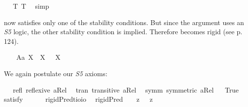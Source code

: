 \begin{isabellebody}
\ %
%
\isamarkupfalse%
\ T{}\ T{}\ \isamarkupfalse%
\ simp\ \ %
%
%
%
%
\isamarkuptrue%
%
\begin{isamarkuptext}%
\isa{{\isasymP}} now satisfies only one of the stability conditions. But since the argument uses an \emph{S5} logic, 
the other stability condition is implied. Therefore \isa{{\isasymP}} becomes rigid (see p. 124).%
\end{isamarkuptext}\isamarkuptrue%
\isamarkupfalse%
\ \isanewline
\ \ A{}a{\isacharcolon}\ {\isachardoublequoteopen}{\isasymlfloor}\isactrlbold {\isasymforall}X{\isachardot}\ {\isasymP}\ X\ \isactrlbold {\isasymrightarrow}\ \isactrlbold {\isasymbox}{\isacharparenleft}{\isasymP}\ X{\isacharparenright}{\isasymrfloor}{\isachardoublequoteclose}\ \ \ \ \ \ %
%
\begin{isamarkuptext}%
We again postulate our \emph{S5} axioms:%
\end{isamarkuptext}\isamarkuptrue%
\isamarkupfalse%
\ \isanewline
\ refl{\isacharcolon}\ {\isachardoublequoteopen}reflexive\ aRel{\isachardoublequoteclose}\ \isanewline
\ tran{\isacharcolon}\ {\isachardoublequoteopen}transitive\ aRel{\isachardoublequoteclose}\ \isanewline
\ symm{\isacharcolon}\ {\isachardoublequoteopen}symmetric\ aRel{\isachardoublequoteclose}\isanewline
\ \isanewline
{}\isamarkupfalse%
\ True\ \isamarkupfalse%
{\isacharbrackleft}satisfy{\isacharbrackright}%
\ %
%
\isamarkupfalse%
\ %
%
%
%
\isanewline
\ \isanewline
{}\isamarkupfalse%
\ rigidPred{\isacharcolon}{\isacharcolon}{\isachardoublequoteopen}{\isacharparenleft}{\isacharprime}t{\isasymRightarrow}io{\isacharparenright}{\isasymRightarrow}io{\isachardoublequoteclose}\ \isanewline
\ {\isachardoublequoteopen}rigidPred\ {\isasymtau}\ {\isasymequiv}\ {\isacharparenleft}{\isasymlambda}{\isasymbeta}{\isachardot}\ \isactrlbold {\isasymbox}{\isacharparenleft}{\isacharparenleft}{\isasymlambda}z{\isachardot}\ {\isasymbeta}\ \isactrlbold {\isasymapprox}\ z{\isacharparenright}\ \isactrlbold {\isasymdown}{\isasymtau}{\isacharparenright}{\isacharparenright}\ \isactrlbold {\isasymdown}{\isasymtau}{\isachardoublequoteclose}\isanewline

\end{isabellebody}

